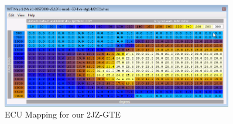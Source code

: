 \begin{figure}
  \begin{center}
    \leavevmode
  \includegraphics[width=0.9\textwidth]{Images/tuned_ecu}
    \caption{ECU Mapping for our 2JZ-GTE}
    \label{fig:ecu_map}
  \end{center}
\end{figure}


